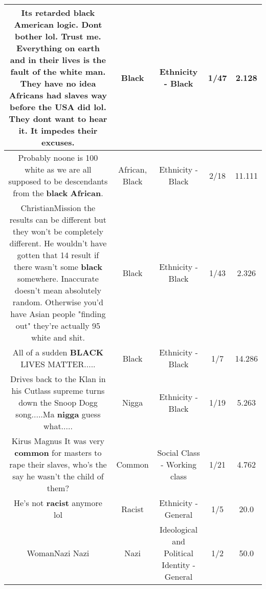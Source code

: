 \documentclass[11pt]{article}
\newlength\mylength
\begin{document}
\begin{center}
\begin{longtable}{|C{.65\mylength}|C{.30\mylength}|C{.12\mylength}|C{.12\mylength}|C{.12\mylength}|}
  \small Its retarded \textbf{black} American logic.  Dont bother lol.  Trust me.  Everything on earth and in their lives is the fault of the white man.  They have no idea Africans had slaves way before the USA did lol.  They dont want to hear it.  It impedes their excuses.\normalsize   & Black & Ethnicity - Black & 1/47 & 2.128 \\  \hline
  \small Probably noone is 100  white as we are all supposed to be descendants from the \textbf{black} \textbf{African}.\normalsize   & African, Black & Ethnicity - Black & 2/18 & 11.111 \\  \hline
  \small ChristianMission the results can be different but they won't be completely different. He wouldn't have gotten that 14 result if there wasn't some \textbf{black} somewhere. Inaccurate doesn't mean absolutely random. Otherwise you'd have Asian people "finding out" they're actually 95 white and shit.\normalsize   & Black & Ethnicity - Black & 1/43 & 2.326 \\  \hline
  \small All of a sudden \textbf{BLACK} LIVES MATTER.....\normalsize   & Black & Ethnicity - Black & 1/7 & 14.286 \\  \hline
  \small Drives back to the Klan in his Cutlass supreme turns down the Snoop Dogg song.....Ma \textbf{nigga} guess what.....\normalsize   & Nigga & Ethnicity - Black & 1/19 & 5.263 \\  \hline
  \small Kirus Magnus It was very \textbf{common} for masters to rape their slaves, who's the say he wasn't the child of them?\normalsize   & Common & Social Class - Working class & 1/21 & 4.762 \\  \hline
  \small He's not \textbf{racist} anymore lol\normalsize   & Racist & Ethnicity - General & 1/5 & 20.0 \\  \hline
  \small WomanNazi Nazi\normalsize   & Nazi &  Ideological and Political Identity - General & 1/2 & 50.0 \\  \hline

\end{longtable}
\end{center}
\end{document}
